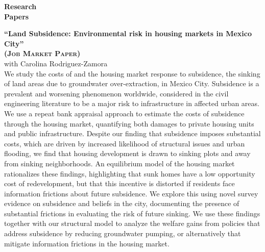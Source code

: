 \documentclass[10pt, oneside]{article}
\begin{document}
\begin{minipage}[t]{0.1\linewidth}
\textbf{Research \\ Papers}
\end{minipage}\hspace{0.05\linewidth}
\begin{minipage}[t]{0.8\linewidth}
\textbf{``Land Subsidence: Environmental risk in housing markets in Mexico City''\\ 
(\textsc{Job Market Paper})}\\ 
 with Carolina Rodriguez-Zamora \\

We study the costs of and the housing market response to subsidence, the sinking of land areas due to groundwater over-extraction, in Mexico City. Subsidence is a prevalent and worsening phenomenon worldwide, considered in the civil engineering literature to be a major risk to infrastructure in affected urban areas. We use a repeat bank appraisal approach to estimate the costs of subsidence through the housing market, quantifying both damages to private housing units and public infrastructure. Despite our finding that subsidence imposes substantial costs, which are driven by increased likelihood of structural issues and urban flooding, we find that housing development is drawn to sinking plots and away from sinking neighborhoods. An equilibrium model of the housing market rationalizes these findings, highlighting that sunk homes have a low opportunity cost of redevelopment, but that this incentive is distorted if residents face information frictions about future subsidence. We explore this using novel survey evidence on subsidence and beliefs in the city, documenting the presence of substantial frictions in evaluating the risk of future sinking. We use these findings together with our structural model to analyze the welfare gains from policies that address subsidence by reducing groundwater pumping, or alternatively that mitigate information frictions in the housing market.

\end{minipage}\vspace{5mm}
\end{document}
